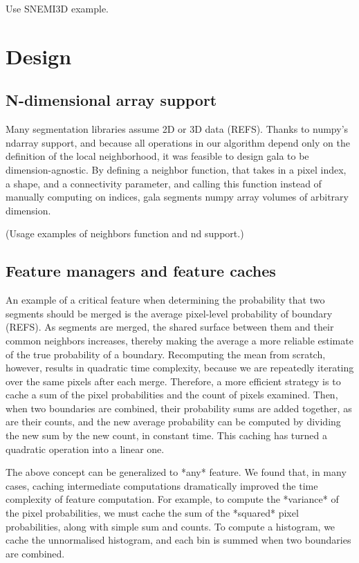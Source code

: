 \documentclass{frontiersSCNS} %
\begin{document}
Use SNEMI3D example.


\section{Design}


\subsection{N-dimensional array support}
Many segmentation libraries assume 2D or 3D data (REFS).
Thanks to numpy's ndarray support, and because all operations in our algorithm depend only on the definition of the local neighborhood, it was feasible to design gala to be dimension-agnostic.
By defining a neighbor function, that takes in a pixel index, a shape, and a connectivity parameter, and calling this function instead of manually computing on indices, gala segments numpy array volumes of arbitrary dimension.

(Usage examples of neighbors function and nd support.)


\subsection{Feature managers and feature caches}

An example of a critical feature when determining the probability that two segments should be merged is the average pixel-level probability of boundary (REFS).
As segments are merged, the shared surface between them and their common neighbors increases, thereby making the average a more reliable estimate of the true probability of a boundary.
Recomputing the mean from scratch, however, results in quadratic time complexity, because we are repeatedly iterating over the same pixels after each merge.
Therefore, a more efficient strategy is to cache a sum of the pixel probabilities and the count of pixels examined.
Then, when two boundaries are combined, their probability sums are added together, as are their counts, and the new average probability can be computed by dividing the new sum by the new count, in constant time.
This caching has turned a quadratic operation into a linear one.

The above concept can be generalized to *any* feature.
We found that, in many cases, caching intermediate computations dramatically improved the time complexity of feature computation.
For example, to compute the *variance* of the pixel probabilities, we must cache the sum of the *squared* pixel probabilities, along with simple sum and counts.
To compute a histogram, we cache the unnormalised histogram, and each bin is summed when two boundaries are combined.
\end{document}
